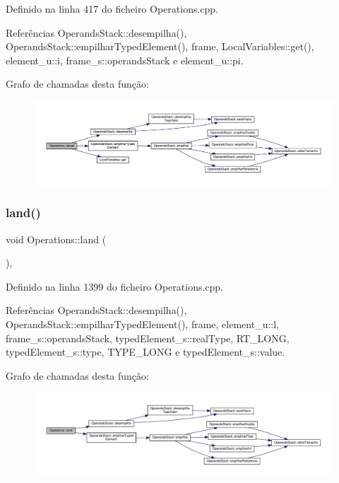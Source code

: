 Definido na linha 417 do ficheiro Operations.\+cpp.



Referências Operands\+Stack\+::desempilha(), Operands\+Stack\+::empilhar\+Typed\+Element(), frame, Local\+Variables\+::get(), element\+\_\+u\+::i, frame\+\_\+s\+::operands\+Stack e element\+\_\+u\+::pi.

Grafo de chamadas desta função\+:\nopagebreak
\begin{figure}[H]
\begin{center}
\leavevmode
\includegraphics[width=350pt]{classOperations_a064f10825e8f0153ef19d466845d3734_cgraph}
\end{center}
\end{figure}
\mbox{\label{classOperations_a6104d728be025abb71570139b988ed4e}} 
\subsubsection{\texorpdfstring{land()}{land()}}
{\footnotesize\ttfamily void Operations\+::land (\begin{DoxyParamCaption}{ }\end{DoxyParamCaption})\hspace{0.3cm}{\ttfamily [static]}, {\ttfamily [private]}}



Definido na linha 1399 do ficheiro Operations.\+cpp.



Referências Operands\+Stack\+::desempilha(), Operands\+Stack\+::empilhar\+Typed\+Element(), frame, element\+\_\+u\+::l, frame\+\_\+s\+::operands\+Stack, typed\+Element\+\_\+s\+::real\+Type, R\+T\+\_\+\+L\+O\+NG, typed\+Element\+\_\+s\+::type, T\+Y\+P\+E\+\_\+\+L\+O\+NG e typed\+Element\+\_\+s\+::value.

Grafo de chamadas desta função\+:\nopagebreak
\begin{figure}[H]
\begin{center}
\leavevmode
\includegraphics[width=350pt]{classOperations_a6104d728be025abb71570139b988ed4e_cgraph}
\end{center}
\end{figure}
\mbox{\label{classOperations_a562813150c331183212c11e5593b83c6}} 
